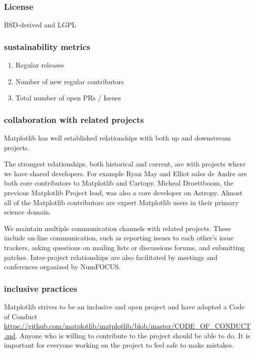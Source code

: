 \documentclass[12pt]{article}
\numberwithin{page}{section}
\begin{document}
\subsubsection{License}

BSD-derived and LGPL

\subsubsection{sustainability metrics}
\begin{enumerate}
\item Regular releases
\item Number of new regular contributors
\item Total number of open PRs / Issues
\end{enumerate}

\subsubsection{collaboration with related projects}
Matplotlib has well established relationships with both up and
downstream projects.

The strongest relationships, both historical and current, are with
projects where we have shared developers.  For example Ryan May and
Elliot sales de Andre are both core contributors to Matplotlib and
Cartopy.  Micheal Droettboom, the previous Matplotlib Project lead,
was also a core developer on Astropy.  Almost all of the Matplotlib
contributors are expert Matplotlib users in their primary science
domain.

We maintain multiple communication channels with related projects.
These include on-line communication, such as reporting issues to each
other's issue trackers, asking questions on mailing lists or
discussions forums, and submitting patches.  Inter-project
relationships are also facilitated by meetings and conferences
organized by NumFOCUS.



\subsubsection{inclusive practices}

Matplotlib strives to be an inclusive and open project and have
adopted a Code of Conduct
\url{https://github.com/matplotlib/matplotlib/blob/master/CODE_OF_CONDUCT.md}. Anyone
who is willing to contribute to the project should be able to do.  It
is important for everyone working on the project to feel safe to make
mistakes.
\end{document}
